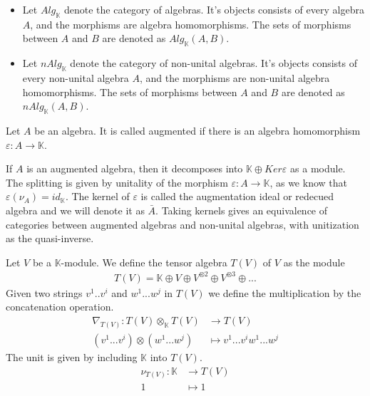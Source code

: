 \documentclass[../../thesis.tex]{subfiles}
\begin{document}
            \begin{definition}
                \begin{itemize}
                    \item Let $Alg_{\mathbb{K}}$ denote the category of algebras. It's objects consists of every algebra $A$, and the morphisms are algebra homomorphisms. The sets of morphisms between $A$ and $B$ are denoted as $Alg_{\mathbb{K}}(A,B)$.
                    \item Let $nAlg_{\mathbb{K}}$ denote the category of non-unital algebras. It's objects consists of every non-unital algebra $A$, and the morphisms are non-unital algebra homomorphisms. The sets of morphisms between $A$ and $B$ are denoted as $nAlg_{\mathbb{K}}(A,B)$.
                \end{itemize}
            \end{definition}

            \begin{definition}
                Let $A$ be an algebra. It is called augmented if there is an algebra homomorphism $\varepsilon : A \rightarrow \mathbb{K}$.
            \end{definition}

            If $A$ is an augmented algebra, then it decomposes into $\mathbb{K}\oplus Ker\varepsilon$ as a module. The splitting is given by unitality of the morphism $\varepsilon: A \rightarrow \mathbb{K}$, as we know that $\varepsilon(\nu_A) = id_{\mathbb{K}}$. The kernel of $\varepsilon$ is called the augmentation ideal or redecued algebra and we will denote it as $\bar{A}$. Taking kernels gives an equivalence of categories between augmented algebras and non-unital algebras, with unitization as the quasi-inverse.

            \begin{definition}
                Let $V$ be a $\mathbb{K}$-module. We define the tensor algebra $T(V)$ of $V$ as the module
                \begin{align*}
                    T(V) = \mathbb{K}\oplus V\oplus V^{\otimes 2} \oplus V^{\otimes 3} \oplus ...
                \end{align*}
                Given two strings $v^1..v^i$ and $w^1...w^j$ in $T(V)$ we define the multiplication by the concatenation operation.
                \begin{align*}
                    \nabla_{T(V)} : T(V)\otimes_{\mathbb{K}} T(V) & \rightarrow T(V) \\
                    (v^1...v^i)\otimes(w^1...w^j) & \mapsto v^1...v^iw^1...w^j
                \end{align*}
                The unit is given by including $\mathbb{K}$ into $T(V)$.
                \begin{align*}
                    \nu_{T(V)} : \mathbb{K} & \rightarrow T(V) \\
                    1 & \mapsto 1
                \end{align*}
            \end{definition}
\end{document}
